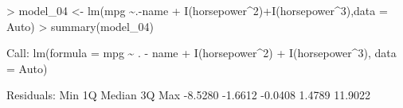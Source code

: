 \documentclass[
]{article}
\newenvironment{Shaded}{\begin{snugshade}}{\end{snugshade}}
\newcommand{\AttributeTok}[1]{\textcolor[rgb]{0.77,0.63,0.00}{#1}}
\newcommand{\DecValTok}[1]{\textcolor[rgb]{0.00,0.00,0.81}{#1}}
\newcommand{\FloatTok}[1]{\textcolor[rgb]{0.00,0.00,0.81}{#1}}
\newcommand{\FunctionTok}[1]{\textcolor[rgb]{0.00,0.00,0.00}{#1}}
\newcommand{\NormalTok}[1]{#1}
\newcommand{\OtherTok}[1]{\textcolor[rgb]{0.56,0.35,0.01}{#1}}
\newcommand{\SpecialCharTok}[1]{\textcolor[rgb]{0.00,0.00,0.00}{#1}}
\begin{document}
\begin{Shaded}
\begin{Highlighting}[]
\SpecialCharTok{\textgreater{}}\NormalTok{ model\_04 }\OtherTok{\textless{}{-}} \FunctionTok{lm}\NormalTok{(mpg }\SpecialCharTok{\textasciitilde{}}\NormalTok{.}\SpecialCharTok{{-}}\NormalTok{name }\SpecialCharTok{+} \FunctionTok{I}\NormalTok{(horsepower}\SpecialCharTok{\^{}}\DecValTok{2}\NormalTok{)}\SpecialCharTok{+}\FunctionTok{I}\NormalTok{(horsepower}\SpecialCharTok{\^{}}\DecValTok{3}\NormalTok{),}\AttributeTok{data =}\NormalTok{ Auto)}
\SpecialCharTok{\textgreater{}} \FunctionTok{summary}\NormalTok{(model\_04)}

\NormalTok{Call}\SpecialCharTok{:}
\FunctionTok{lm}\NormalTok{(}\AttributeTok{formula =}\NormalTok{ mpg }\SpecialCharTok{\textasciitilde{}}\NormalTok{ . }\SpecialCharTok{{-}}\NormalTok{ name }\SpecialCharTok{+} \FunctionTok{I}\NormalTok{(horsepower}\SpecialCharTok{\^{}}\DecValTok{2}\NormalTok{) }\SpecialCharTok{+} \FunctionTok{I}\NormalTok{(horsepower}\SpecialCharTok{\^{}}\DecValTok{3}\NormalTok{), }
    \AttributeTok{data =}\NormalTok{ Auto)}

\NormalTok{Residuals}\SpecialCharTok{:}
\NormalTok{    Min      1Q  Median      3Q     Max }
\SpecialCharTok{{-}}\FloatTok{8.5280} \SpecialCharTok{{-}}\FloatTok{1.6612} \SpecialCharTok{{-}}\FloatTok{0.0408}  \FloatTok{1.4789} \FloatTok{11.9022} 


\end{Highlighting}
\end{Shaded}
\end{document}
